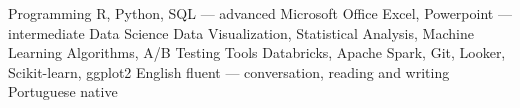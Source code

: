 \begin{cvskills}
  \cvskill
    {Programming}
    {R, Python, SQL — advanced}
  \cvskill
    {Microsoft Office}
    {Excel, Powerpoint — intermediate}
  \cvskill
    {Data Science}
    {Data Visualization, Statistical Analysis, Machine Learning Algorithms, A/B Testing}
  \cvskill
    {Tools}
    {Databricks, Apache Spark, Git, Looker, Scikit-learn, ggplot2}
  \cvskill
    {English}
    {fluent — conversation, reading and writing}
  \cvskill
    {Portuguese}
    {native}
\end{cvskills}
